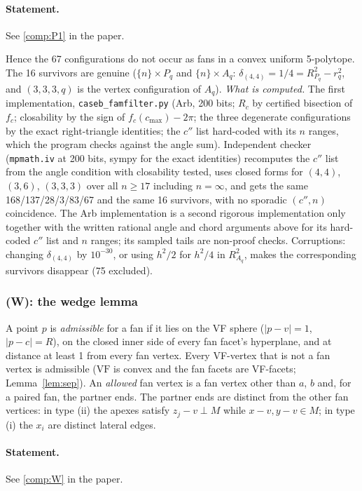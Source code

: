 \documentclass[11pt]{article}
\theoremstyle{definition}
\theoremstyle{remark}
\newcommand{\VF}{\mathrm{VF}}
\newcommand{\file}[1]{\path{#1}}
\begin{document}
\setcounter{theorem}{10}
\paragraph{Statement.} See \ref{comp:P1} in the paper.


\noindent Hence the 67 configurations do not occur as fans in a convex
uniform 5-polytope. The 16 survivors are genuine ($\{n\}\times P_q$ and
$\{n\}\times A_q$: $\delta_{(4,4)}=1/4=R_{P_q}^2-r_q^2$, and $(3,3,3,q)$ is the
vertex configuration of $A_q$). \emph{What is computed.} The first implementation,
\texttt{caseb\_famfilter.py} (Arb, 200 bits; $R_c$ by certified bisection
of $f_c$; closability by the sign of $f_c(c_{\max})-2\pi$; the three
degenerate configurations by the exact right-triangle identities; the $c''$
list hard-coded with its $n$ ranges, which the program checks against the
angle sum). Independent checker \file{checks/check_caseb/p1check.py}
(\texttt{mpmath.iv} at 200 bits, sympy for the exact identities) recomputes
the $c''$ list from the angle condition with closability tested, uses
closed forms for $(4,4)$, $(3,6)$, $(3,3,3)$ over all $n\ge17$ including
$n=\infty$, and gets the same 168/137/28/3/83/67 and the same 16
survivors, with no sporadic $(c'',n)$ coincidence. The Arb implementation is a
second rigorous implementation only together with the written rational
angle and chord arguments above for its hard-coded $c''$ list and $n$
ranges; its sampled tails are non-proof checks. Corruptions: changing
$\delta_{(4,4)}$ by $10^{-30}$, or using $h^2/2$ for $h^2/4$ in $R_{A_q}^2$, makes
the corresponding survivors disappear (75 excluded).
\subsubsection{(W): the wedge lemma}\label{sec:W}

A point $p$ is \emph{admissible} for a fan if it lies on the VF sphere
($|p-v|=1$, $|p-c|=R$), on the closed inner side of every fan facet's
hyperplane, and at distance at least 1 from every fan vertex. Every
VF-vertex that is not a fan vertex is admissible ($\VF$ is convex and the
fan facets are VF-facets; Lemma~\ref{lem:sep}). An \emph{allowed} fan
vertex is a fan vertex other than $a$, $b$ and, for a paired fan, the
partner ends. The partner ends are distinct from the other fan vertices: in
type (ii) the apexes satisfy $z_j-v\perp M$ while $x-v,y-v\in M$; in type (i) the $x_i$ are distinct
lateral edges.

\setcounter{theorem}{11}
\paragraph{Statement.} See \ref{comp:W} in the paper.
\end{document}
